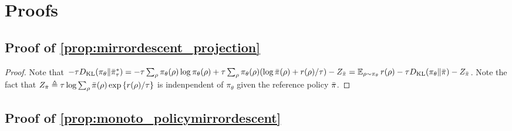 
\section{Proofs} %


\subsection{Proof of \cref{prop:mirrordescent_projection}}

\begin{proof}
	Note that $-\tau D_{\mathrm{KL}}(\pi_\theta \| \bar{\pi}_\tau^*) = - \tau \sum_{\rho}{ \pi_\theta(\rho) \log \pi_\theta(\rho) } + \tau \sum_{\rho}{ \pi_\theta(\rho) (\log \bar{\pi}(\rho) + r(\rho) / \tau ) }  - Z_{\bar{\pi}} = \operatorname*{\mathbb{E}}_{\rho \sim \pi_\theta}{  r(\rho)  - \tau D_{\mathrm{KL}}(\pi_\theta \| \bar{\pi}) } - Z_{\bar{\pi}}$. Note the fact that $Z_{\bar{\pi}} \triangleq \tau \log{ \sum_{\rho}{\bar{\pi}(\rho) \exp\left\{ r(\rho) / \tau \right\} } }$ is indenpendent of $\pi_\theta$ given the reference policy $\bar{\pi}$.
\end{proof}

\subsection{Proof of \cref{prop:monoto_policymirrordescent}}
\label{appsec:monoto_policymirrordescent}

